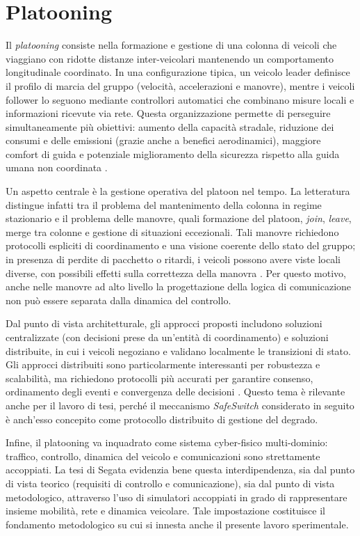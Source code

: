 \section{Platooning}
\label{sec:sota_platooning}

Il \emph{platooning} consiste nella formazione e gestione di una colonna di veicoli che viaggiano con ridotte distanze inter-veicolari mantenendo un comportamento longitudinale coordinato. In una configurazione tipica, un veicolo leader definisce il profilo di marcia del gruppo (velocità, accelerazioni e manovre), mentre i veicoli follower lo seguono mediante controllori automatici che combinano misure locali e informazioni ricevute via rete. Questa organizzazione permette di perseguire simultaneamente più obiettivi: aumento della capacità stradale, riduzione dei consumi e delle emissioni (grazie anche a benefici aerodinamici), maggiore comfort di guida e potenziale miglioramento della sicurezza rispetto alla guida umana non coordinata \cite{robinson2010operating,segata2016safe,dressler2019cooperative}.

Un aspetto centrale è la gestione operativa del platoon nel tempo. La letteratura distingue infatti tra il problema del mantenimento della colonna in regime stazionario e il problema delle manovre, quali formazione del platoon, \emph{join}, \emph{leave}, merge tra colonne e gestione di situazioni eccezionali. Tali manovre richiedono protocolli espliciti di coordinamento e una visione coerente dello stato del gruppo; in presenza di perdite di pacchetto o ritardi, i veicoli possono avere viste locali diverse, con possibili effetti sulla correttezza della manovra \cite{segata2014supporting,santini2019platooning}. Per questo motivo, anche nelle manovre ad alto livello la progettazione della logica di comunicazione non può essere separata dalla dinamica del controllo.

Dal punto di vista architetturale, gli approcci proposti includono soluzioni centralizzate (con decisioni prese da un’entità di coordinamento) e soluzioni distribuite, in cui i veicoli negoziano e validano localmente le transizioni di stato. Gli approcci distribuiti sono particolarmente interessanti per robustezza e scalabilità, ma richiedono protocolli più accurati per garantire consenso, ordinamento degli eventi e convergenza delle decisioni \cite{santini2017consensusbased,santini2019platooning}. Questo tema è rilevante anche per il lavoro di tesi, perché il meccanismo \emph{SafeSwitch} considerato in seguito è anch’esso concepito come protocollo distribuito di gestione del degrado.

Infine, il platooning va inquadrato come sistema cyber-fisico multi-dominio: traffico, controllo, dinamica del veicolo e comunicazioni sono strettamente accoppiati. La tesi di Segata \cite{segata2016safe} evidenzia bene questa interdipendenza, sia dal punto di vista teorico (requisiti di controllo e comunicazione), sia dal punto di vista metodologico, attraverso l’uso di simulatori accoppiati in grado di rappresentare insieme mobilità, rete e dinamica veicolare. Tale impostazione costituisce il fondamento metodologico su cui si innesta anche il presente lavoro sperimentale.

